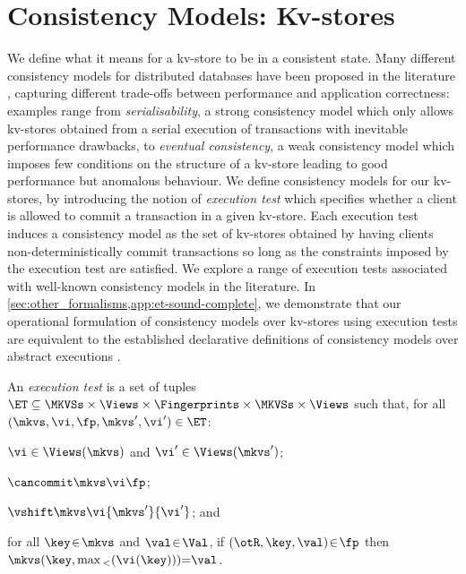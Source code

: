 \section{Consistency Models: Kv-stores}
\label{sec:cm}
We define what it means for a kv-store 
to be in a consistent state. Many different consistency models for
distributed databases have 
been proposed in the literature
\cite{principle-eventual-consistency,rola,redblue,PSI,si},
capturing different trade-offs 
between  performance and application
correctness: examples range from  \emph{serialisability}, a strong
consistency model which only allows kv-stores 
obtained  from a serial execution of transactions
with inevitable performance drawbacks, to  \emph{eventual consistency},  a weak consistency model
which imposes few conditions on the structure of a kv-store leading to
good performance but anomalous behaviour.
We define consistency models for our kv-stores,
by introducing the notion of 
\emph{execution test} which specifies  whether a client is allowed to commit a transaction in a given 
kv-store. Each execution test induces a consistency model as the set of kv-stores obtained 
by having clients non-deterministically commit transactions so long as  the constraints 
imposed by the execution test are satisfied.
We explore a range of execution tests  associated with well-known consistency models in the literature. 
In \cref{sec:other_formalisms,app:et-sound-complete},  we demonstrate that our operational
formulation of  consistency models over kv-stores using execution
tests are  equivalent to the established declarative definitions of
consistency models over abstract executions \cite{ev_transactions,framework-concur}.

\spaceshrink{-3pt}
\begin{definition}
\label{def:execution.test}
An \emph{execution test} is a set of tuples \(\ET \subseteq \MKVSs \times \Views \times \Fingerprints \times \MKVSs \times \Views\) 
such that, for all \((\mkvs, \vi, \fp, \mkvs', \vi') \in \ET\): 
\begin{enumerate*}
	\item \(\vi \in \Views(\mkvs)\) and \(\vi' \in \Views(\mkvs')\); 
	\item \(\cancommit \mkvs \vi \fp\); 
	\item \(\vshift \mkvs \vi {\allowbreak \mkvs'} {\vi'}\); and 
	\item for all \(\key \!\in\! \mkvs\) and \(\val \!\in\! \Val\), if \((\otR, \key, \val) \!\in\! \fp \) then \(	\mkvs(\key, \max{}_{<}(\vi(\key))) {=} \val   \).
\end{enumerate*}
\end{definition}
\spaceshrink{-3pt}

